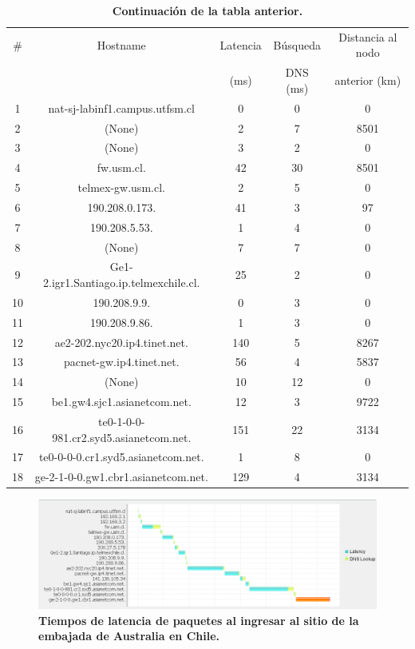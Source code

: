 \documentclass[12pt]{article}
\begin{document}
\begin{table}[H]
\centering
\begin{tabular}{| c | c | c | c | c |}
\hline
\# & Hostname & Latencia & Búsqueda & Distancia al nodo\\
 &  & (ms) & DNS (ms) & anterior (km)\\
\hline
1 & nat-sj-labinf1.campus.utfsm.cl & 0 & 0 & 0\\
\hline
2 & (None) & 2 & 7 & 8501\\
\hline
3 & (None) & 3 & 2 & 0\\
\hline
4 & fw.usm.cl. & 42 & 30 & 8501\\
\hline
5 & telmex-gw.usm.cl. & 2 & 5 & 0\\
\hline
6 & 190.208.0.173. & 41 & 3 & 97\\
\hline
7 & 190.208.5.53. & 1 & 4 & 0\\
\hline
8 & (None) & 7 & 7 & 0\\
\hline
9 & Ge1-2.igr1.Santiago.ip.telmexchile.cl. & 25 & 2 & 0\\
\hline
10 & 190.208.9.9. & 0 & 3 & 0\\
\hline
11 & 190.208.9.86. & 1 & 3 & 0\\
\hline
12 & ae2-202.nyc20.ip4.tinet.net. & 140 & 5 & 8267\\
\hline
13 & pacnet-gw.ip4.tinet.net. & 56 & 4 & 5837\\
\hline
14 & (None) & 10 & 12 & 0\\
\hline
15 & be1.gw4.sjc1.asianetcom.net. & 12 & 3 & 9722\\
\hline
16 & te0-1-0-0-981.cr2.syd5.asianetcom.net. & 151 & 22 & 3134\\
\hline
17 & te0-0-0-0.cr1.syd5.asianetcom.net. & 1 & 8 & 0\\
\hline
18 & ge-2-1-0-0.gw1.cbr1.asianetcom.net. & 129 & 4 & 3134\\
\hline
\end{tabular}
\caption{\small \textbf{Continuación de la tabla anterior.}}
\end{table}

\begin{figure}[H] 
\centering 
\includegraphics[width=1\textwidth]{imagenes/australia_grafica_sinfin.png} \caption{\small \textbf{Tiempos de latencia de paquetes al ingresar al sitio de la embajada de Australia en Chile.}}
\label{fig:diagrama_1} 
\end{figure}
\end{document}
